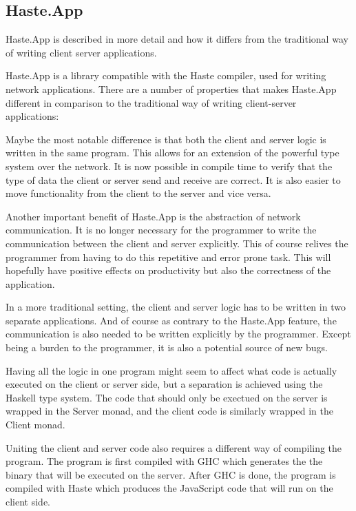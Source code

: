 \documentclass[a4paper]{article}
\begin{document}
\subsection{Haste.App}
Haste.App is described in more detail and how it differs from the traditional way of writing client server applications.

Haste.App is a library compatible with the Haste compiler, used for writing network applications.
There are a number of properties that makes Haste.App different in comparison to the traditional way of
writing client-server applications:

Maybe the most notable difference is that both the client and server logic is written in the same program.
This allows for an extension of the powerful type system over the network. It is now possible in compile time
to verify that the type of data the client or server send and receive are correct. It is also easier to
move functionality from the client to the server and vice versa.

Another important benefit of Haste.App is the abstraction of network communication. It is no longer
necessary for the programmer to write the communication between the client and server explicitly. This
of course relives the programmer from having to do this repetitive and error prone task. This will hopefully
have positive effects on productivity but also the correctness of the application.

In a more traditional setting, the client and server logic has to be written in two separate applications. And of course as
contrary to the Haste.App feature, the communication is also needed to be written explicitly by the programmer. Except being
a burden to the programmer, it is also a potential source of new bugs.

Having all the logic in one program might seem to affect what code is actually executed on the client or server side, but
a separation is achieved using the Haskell type system. The code that should only be exectued on the server is wrapped in the
Server monad, and the client code is similarly wrapped in the Client monad.

Uniting the client and server code also requires a different way of compiling the program. The program is first compiled
with GHC which generates the the binary that will be executed on the server. After GHC is done, the program is compiled with
Haste which produces the JavaScript code that will run on the client side.
\end{document}

